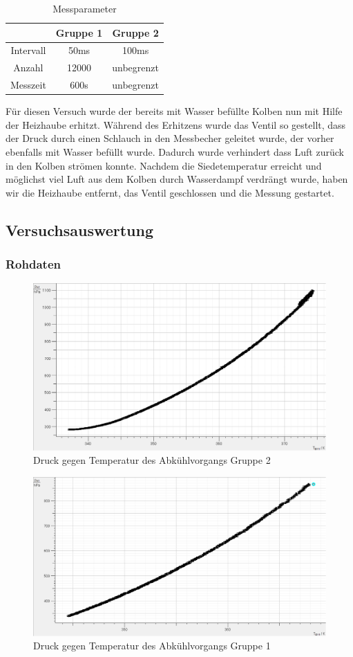 \documentclass[12pt,a4paper]{article}
\begin{document}
\begin{table}[H]\centering \caption{Messparameter} \begin{tabular}{ccc} & Gruppe 1 & Gruppe 2 \\ \hline Intervall & 50ms & 100ms \\ Anzahl & 12000 & unbegrenzt \\ Messzeit & 600s & unbegrenzt \\ \end{tabular} \end{table}
Für diesen Versuch wurde der bereits mit Wasser befüllte Kolben nun mit Hilfe der Heizhaube erhitzt. Während des Erhitzens wurde das Ventil so gestellt, dass der Druck durch einen Schlauch in den Messbecher geleitet wurde, der vorher ebenfalls mit Wasser befüllt wurde. Dadurch wurde verhindert dass Luft zurück in den Kolben strömen konnte.
Nachdem die Siedetemperatur erreicht und möglichst viel Luft aus dem Kolben durch Wasserdampf verdrängt wurde, haben wir die Heizhaube entfernt, das Ventil geschlossen und die Messung gestartet.
\subsection{Versuchsauswertung}
\subsubsection{Rohdaten}
\begin{figure}[H]
\centering
\includegraphics[scale=0.5]{Bilder/RohdatenHaupmessungGrp2.png}
\caption{Druck gegen Temperatur des Abkühlvorgangs Gruppe 2}
\end{figure}
\begin{figure}[H]
\centering
\includegraphics[scale=0.5]{Bilder/RohdatenHaupmessungGrp11.png}
\caption{Druck gegen Temperatur des Abkühlvorgangs Gruppe 1}
\end{figure}
\end{document}
